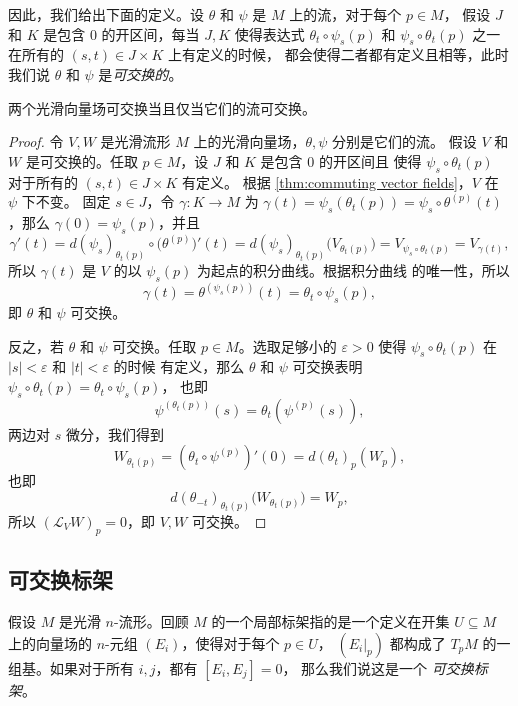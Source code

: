 因此，我们给出下面的定义。设 $\theta$ 和 $\psi$ 是 $M$ 上的流，对于每个 $p\in M$，
假设 $J$ 和 $K$ 是包含 $0$ 的开区间，每当 $J,K$ 使得表达式 $\theta_t\circ\psi_s(p)$
和 $\psi_s\circ\theta_t(p)$ 之一在所有的 $(s,t)\in J\times K$ 上有定义的时候，
都会使得二者都有定义且相等，此时我们说 $\theta$ 和 $\psi$ 是\emph{可交换的}。

\begin{theorem}
  两个光滑向量场可交换当且仅当它们的流可交换。
\end{theorem}
\begin{proof}
  令 $V,W$ 是光滑流形 $M$ 上的光滑向量场，$\theta,\psi$ 分别是它们的流。
  假设 $V$ 和 $W$ 是可交换的。任取 $p\in M$，设 $J$ 和 $K$ 是包含 $0$ 的开区间且
  使得 $\psi_s\circ\theta_t(p)$ 对于所有的 $(s,t)\in J\times K$ 有定义。
  根据 \autoref{thm:commuting vector fields}，$V$ 在 $\psi$ 下不变。
  固定 $s\in J$，令 $\gamma:K\to M$ 为 $\gamma(t)=\psi_s(\theta_t(p))=\psi_s\circ\theta^{(p)}(t)$，那么
  $\gamma(0)=\psi_s(p)$，并且
  \[
    \gamma'(t)=d(\psi_s)_{\theta_t(p)}\circ\bigl(\theta^{(p)}\bigr)'(t)
    =d(\psi_s)_{\theta_t(p)}\bigl(V_{\theta_t(p)}\bigr)
    =V_{\psi_s\circ\theta_t(p)}=V_{\gamma(t)},
  \]
  所以 $\gamma(t)$ 是 $V$ 的以 $\psi_s(p)$ 为起点的积分曲线。根据积分曲线
  的唯一性，所以
  \[
    \gamma(t)=\theta^{\left(\psi_s(p)\right)}(t)=\theta_t\circ\psi_s(p),
  \]
  即 $\theta$ 和 $\psi$ 可交换。

  反之，若 $\theta$ 和 $\psi$ 可交换。任取 $p\in M$。选取足够小的 $\varepsilon>0$
  使得 $\psi_s\circ\theta_t(p)$ 在 $|s|<\varepsilon$ 和 $|t|<\varepsilon$ 的时候
  有定义，那么 $\theta$ 和 $\psi$ 可交换表明 $\psi_s\circ\theta_t(p)=\theta_t\circ\psi_s(p)$，
  也即
  \[
    \psi^{\left(\theta_t(p)\right)}(s)=\theta_t\left(\psi^{(p)}(s)\right),
  \]
  两边对 $s$ 微分，我们得到
  \[
    W_{\theta_t(p)}= \left(\theta_t\circ\psi^{(p)}\right)'(0) = d(\theta_t)_{p}\left(W_{p}\right),
  \]
  也即
  \[
    d(\theta_{-t})_{\theta_t(p)}\bigl(W_{\theta_t(p)}\bigr)=W_p,
  \]
  所以 $(\mathcal{L}_VW)_p=0$，即 $V,W$ 可交换。
\end{proof}

\subsection{可交换标架}

假设 $M$ 是光滑 $n$-流形。回顾 $M$ 的一个局部标架指的是一个定义在开集
$U\subseteq M$ 上的向量场的 $n$-元组 $(E_i)$，使得对于每个 $p\in U$，
$(E_i|_p)$ 都构成了 $T_pM$ 的一组基。如果对于所有 $i,j$，都有 $[E_i,E_j]=0$，
那么我们说这是一个 \emph{可交换标架}。


